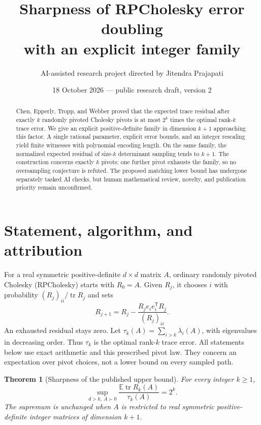 \documentclass[10pt,letterpaper]{article}
\title{Sharpness of RPCholesky error doubling\\with an explicit integer family}
\author{\small AI-assisted research project directed by Jitendra Prajapati}
\date{18 October 2026 --- public research draft, version 2}
\newtheorem{theorem}{Theorem}
\DeclareMathOperator{\tr}{tr}
\newcommand{\E}{\mathbb E}
\begin{document}
\maketitle
\begin{abstract}
Chen, Epperly, Tropp, and Webber proved that the expected trace residual
after exactly $k$ randomly pivoted Cholesky pivots is at most $2^k$ times
the optimal rank-$k$ trace error. We give an explicit positive-definite
family in dimension $k+1$ approaching this factor. A single rational
parameter, explicit error bounds, and an integer rescaling yield finite
witnesses with polynomial encoding length. On the same family, the
normalized expected residual of size-$k$ determinant sampling tends to
$k+1$. The construction concerns exactly $k$ pivots; one further pivot
exhausts the family, so no oversampling conjecture is refuted. The proposed
matching lower bound has undergone separately tasked AI checks, but human
mathematical review, novelty, and publication priority remain unconfirmed.
\end{abstract}

\section{Statement, algorithm, and attribution}

For a real symmetric positive-definite $d\times d$ matrix $A$, ordinary
randomly pivoted Cholesky (RPCholesky) starts with $R_0=A$. Given $R_j$,
it chooses $i$ with probability $(R_j)_{ii}/\tr R_j$ and sets
\[
 R_{j+1}=R_j-\frac{R_je_ie_i^{\mathsf T}R_j}{(R_j)_{ii}}.
\]
An exhausted residual stays zero. Let
$\tau_k(A)=\sum_{i>k}\lambda_i(A)$, with eigenvalues in decreasing order.
Thus $\tau_k$ is the optimal rank-$k$ trace error. All statements below
use exact arithmetic and this prescribed pivot law. They concern an
expectation over pivot choices, not a lower bound on every sampled path.

\begin{theorem}[Sharpness of the published upper bound]\label{thm:sharp}
For every integer $k\geq1$,
\begin{equation}\label{eq:supremum}
 \sup_{d>k,\ A\succ0}\frac{\E\tr R_k(A)}{\tau_k(A)}=2^k.
\end{equation}
The supremum is unchanged when $A$ is restricted to real symmetric
positive-definite integer matrices of dimension $k+1$.
\end{theorem}
\end{document}
